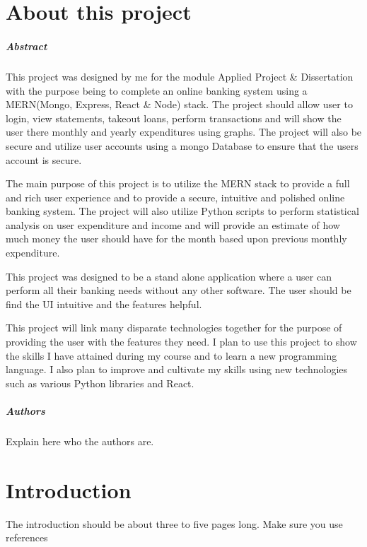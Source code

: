 
\chapter*{About this project}
\paragraph{Abstract}
This project was designed by me for the module Applied Project \& Dissertation with the purpose being
to complete an online banking system using a MERN(Mongo, Express, React \& Node) stack.
The project should allow user to login, view statements, takeout loans, perform transactions and
will show the user there monthly and yearly expenditures using graphs. The project will also be
secure and utilize user accounts using a mongo Database to ensure that the users account is secure.


The main purpose of this project is to utilize the MERN stack to provide a full and rich user
experience and to provide a secure, intuitive and polished online banking system.  The project
will also utilize Python scripts to perform statistical analysis on user expenditure and income
and will provide an estimate of how much money the user should have for the month based upon previous
monthly expenditure.

This project was designed to be a stand alone application where a user can perform all their
banking needs without any other software.  The user should be find the UI intuitive and the
features helpful.

This project will link many disparate technologies together for the purpose of providing the user
with the features they need.  I plan to use this project to show the skills I have attained during
my course and to learn a new programming language. I also plan to improve and cultivate my skills
using new technologies such as various Python libraries and React.



\paragraph{Authors}
Explain here who the authors are.



\chapter{Introduction}
The introduction should be about three to five pages long.
Make sure you use references~\cite{einstein}

